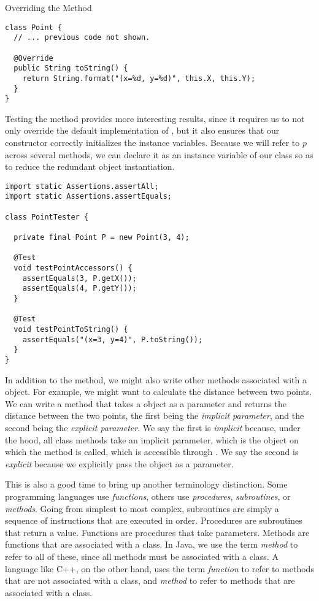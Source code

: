 \begin{cl}[]{Overriding the  Method}
\begin{lstlisting}[language=MyJava]
class Point {
  // ... previous code not shown.

  @Override
  public String toString() {
    return String.format("(x=%d, y=%d)", this.X, this.Y);
  }
}
\end{lstlisting}
\end{cl}

Testing the  method provides more interesting results, since it requires us to not only override the default implementation of , but it also ensures that our constructor correctly initializes the instance variables. Because we will refer to $p$ across several methods, we can declare it as an instance variable of our  class so as to reduce the redundant object instantiation.

\begin{cl}[]{}
\begin{lstlisting}[language=MyJava]
import static Assertions.assertAll;
import static Assertions.assertEquals;

class PointTester {

  private final Point P = new Point(3, 4);

  @Test
  void testPointAccessors() {
    assertEquals(3, P.getX());
    assertEquals(4, P.getY());
  }

  @Test
  void testPointToString() {
    assertEquals("(x=3, y=4)", P.toString());
  }
}
\end{lstlisting}
\end{cl}

In addition to the  method, we might also write other methods associated with a  object. For example, we might want to calculate the distance between two points. We can write a  method that takes a  object as a parameter and returns the distance between the two points, the first being the \textit{implicit parameter}, and the second being the \textit{explicit parameter}. We say the first is \textit{implicit} because, under the hood, all class methods take an implicit parameter, which is the object on which the method is called, which is accessible through . We say the second is \textit{explicit} because we explicitly pass the object as a parameter. 

This is also a good time to bring up another terminology distinction. Some programming languages use \textit{functions}, others use \textit{procedures}, \textit{subroutines}, or \textit{methods}. Going from simplest to most complex, subroutines are simply a sequence of instructions that are executed in order. Procedures are subroutines that return a value. Functions are procedures that take parameters. Methods are functions that are associated with a class. In Java, we use the term \textit{method} to refer to all of these, since all methods must be associated with a class. A language like C++, on the other hand, uses the term \textit{function} to refer to methods that are not associated with a class, and \textit{method} to refer to methods that are associated with a class.

